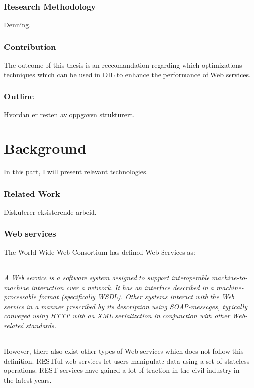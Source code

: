 \documentclass[USenglish]{article}
\begin{document}
\section{Research Methodology}
Denning.

\section{Contribution}
The outcome of this thesis is an reccomandation regarding which optimizations techniques which can be used in DIL to enhance the performance of Web services.

\section{Outline}
Hvordan er resten av oppgaven strukturert.


\part{Background}
In this part, I will present relevant technologies.
\section{Related Work}
Diskuterer eksisterende arbeid.


\section{Web services}
The World Wide Web Consortium has defined Web Services as\cite{wrc-web-service}:
\paragraph{}
\textit{A Web service is a software system designed to support interoperable machine-to-machine interaction over a network. It has an interface described in a machine-processable format (specifically WSDL). Other systems interact with the Web service in a manner prescribed by its description using SOAP-messages, typically conveyed using HTTP with an XML serialization in conjunction with other Web-related standards.}
\paragraph{}
However, there also exist other types of Web services which does not follow this definition. RESTful web services let users manipulate data using a set of stateless operations. REST services have gained a lot of traction in the civil industry in the latest years.
\end{document}
